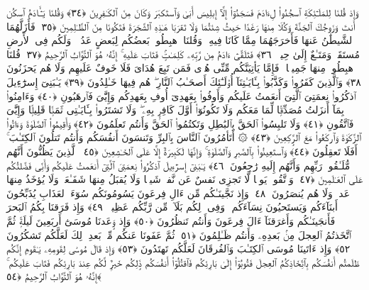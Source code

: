  وَإِذ قُلنَا لِلمَلَـٰٓئِكَةِ ٱسجُدُوا۟ لِءَادَمَ فَسَجَدُوٓا۟ إِلَّآ إِبلِيسَ أَبَىٰ وَٱستَكبَرَ وَكَانَ مِنَ ٱلكَـٰفِرِينَ ﴿٣٤﴾
 وَقُلنَا يَـٰٓـَٔادَمُ ٱسكُن أَنتَ وَزَوجُكَ ٱلجَنَّةَ وَكُلَا مِنهَا رَغَدًا حَيثُ شِئتُمَا وَلَا تَقرَبَا هَـٰذِهِ ٱلشَّجَرَةَ فَتَكُونَا مِنَ ٱلظَّـٰلِمِينَ ﴿٣٥﴾
 فَأَزَلَّهُمَا ٱلشَّيطَٰنُ عَنهَا فَأَخرَجَهُمَا مِمَّا كَانَا فِيهِ ۖ وَقُلنَا ٱهبِطُوا۟ بَعضُكُم لِبَعضٍ عَدُوٌّۭ ۖ وَلَكُم فِى ٱلأَرضِ مُستَقَرٌّۭ وَمَتَـٰعٌ إِلَىٰ حِينٍۢ ﴿٣٦﴾
 فَتَلَقَّىٰٓ ءَادَمُ مِن رَّبِّهِۦ كَلِمَـٰتٍۢ فَتَابَ عَلَيهِ ۚ إِنَّهُۥ هُوَ ٱلتَّوَّابُ ٱلرَّحِيمُ ﴿٣٧﴾
 قُلنَا ٱهبِطُوا۟ مِنهَا جَمِيعًۭا ۖ فَإِمَّا يَأتِيَنَّكُم مِّنِّى هُدًۭى فَمَن تَبِعَ هُدَاىَ فَلَا خَوفٌ عَلَيهِم وَلَا هُم يَحزَنُونَ ﴿٣٨﴾
 وَٱلَّذِينَ كَفَرُوا۟ وَكَذَّبُوا۟ بِـَٔايَـٰتِنَآ أُو۟لَـٰٓئِكَ أَصحَـٰبُ ٱلنَّارِ ۖ هُم فِيهَا خَـٰلِدُونَ ﴿٣٩﴾
 يَـٰبَنِىٓ إِسرَٰٓءِيلَ ٱذكُرُوا۟ نِعمَتِىَ ٱلَّتِىٓ أَنعَمتُ عَلَيكُم وَأَوفُوا۟ بِعَهدِىٓ أُوفِ بِعَهدِكُم وَإِيَّٰىَ فَٱرهَبُونِ ﴿٤٠﴾
 وَءَامِنُوا۟ بِمَآ أَنزَلتُ مُصَدِّقًۭا لِّمَا مَعَكُم وَلَا تَكُونُوٓا۟ أَوَّلَ كَافِرٍۭ بِهِۦ ۖ وَلَا تَشتَرُوا۟ بِـَٔايَـٰتِى ثَمَنًۭا قَلِيلًۭا وَإِيَّٰىَ فَٱتَّقُونِ ﴿٤١﴾
 وَلَا تَلبِسُوا۟ ٱلحَقَّ بِٱلبَٰطِلِ وَتَكتُمُوا۟ ٱلحَقَّ وَأَنتُم تَعلَمُونَ ﴿٤٢﴾
 وَأَقِيمُوا۟ ٱلصَّلَوٰةَ وَءَاتُوا۟ ٱلزَّكَوٰةَ وَٱركَعُوا۟ مَعَ ٱلرَّٟكِعِينَ ﴿٤٣﴾
 ۞ أَتَأمُرُونَ ٱلنَّاسَ بِٱلبِرِّ وَتَنسَونَ أَنفُسَكُم وَأَنتُم تَتلُونَ ٱلكِتَـٰبَ ۚ أَفَلَا تَعقِلُونَ ﴿٤٤﴾
 وَٱستَعِينُوا۟ بِٱلصَّبرِ وَٱلصَّلَوٰةِ ۚ وَإِنَّهَا لَكَبِيرَةٌ إِلَّا عَلَى ٱلخَـٰشِعِينَ ﴿٤٥﴾
 ٱلَّذِينَ يَظُنُّونَ أَنَّهُم مُّلَـٰقُوا۟ رَبِّهِم وَأَنَّهُم إِلَيهِ رَٰجِعُونَ ﴿٤٦﴾
 يَـٰبَنِىٓ إِسرَٰٓءِيلَ ٱذكُرُوا۟ نِعمَتِىَ ٱلَّتِىٓ أَنعَمتُ عَلَيكُم وَأَنِّى فَضَّلتُكُم عَلَى ٱلعَـٰلَمِينَ ﴿٤٧﴾
 وَٱتَّقُوا۟ يَومًۭا لَّا تَجزِى نَفسٌ عَن نَّفسٍۢ شَيـًۭٔا وَلَا يُقبَلُ مِنهَا شَفَـٰعَةٌۭ وَلَا يُؤخَذُ مِنهَا عَدلٌۭ وَلَا هُم يُنصَرُونَ ﴿٤٨﴾
 وَإِذ نَجَّينَـٰكُم مِّن ءَالِ فِرعَونَ يَسُومُونَكُم سُوٓءَ ٱلعَذَابِ يُذَبِّحُونَ أَبنَآءَكُم وَيَستَحيُونَ نِسَآءَكُم ۚ وَفِى ذَٟلِكُم بَلَآءٌۭ مِّن رَّبِّكُم عَظِيمٌۭ ﴿٤٩﴾
 وَإِذ فَرَقنَا بِكُمُ ٱلبَحرَ فَأَنجَينَـٰكُم وَأَغرَقنَآ ءَالَ فِرعَونَ وَأَنتُم تَنظُرُونَ ﴿٥٠﴾
 وَإِذ وَٟعَدنَا مُوسَىٰٓ أَربَعِينَ لَيلَةًۭ ثُمَّ ٱتَّخَذتُمُ ٱلعِجلَ مِنۢ بَعدِهِۦ وَأَنتُم ظَـٰلِمُونَ ﴿٥١﴾
 ثُمَّ عَفَونَا عَنكُم مِّنۢ بَعدِ ذَٟلِكَ لَعَلَّكُم تَشكُرُونَ ﴿٥٢﴾
 وَإِذ ءَاتَينَا مُوسَى ٱلكِتَـٰبَ وَٱلفُرقَانَ لَعَلَّكُم تَهتَدُونَ ﴿٥٣﴾
 وَإِذ قَالَ مُوسَىٰ لِقَومِهِۦ يَـٰقَومِ إِنَّكُم ظَلَمتُم أَنفُسَكُم بِٱتِّخَاذِكُمُ ٱلعِجلَ فَتُوبُوٓا۟ إِلَىٰ بَارِئِكُم فَٱقتُلُوٓا۟ أَنفُسَكُم ذَٟلِكُم خَيرٌۭ لَّكُم عِندَ بَارِئِكُم فَتَابَ عَلَيكُم ۚ إِنَّهُۥ هُوَ ٱلتَّوَّابُ ٱلرَّحِيمُ ﴿٥٤﴾
